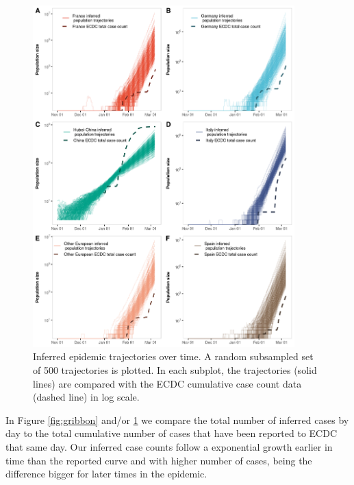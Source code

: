 \documentclass[12pt]{article}
\begin{document}
\begin{figure}[p]
    \centering
    \includegraphics[width=0.9\textwidth]{201030_europe3_figtraj02.png}
    \caption{Inferred epidemic trajectories over time. A random subsampled set of 500 trajectories is plotted. In each subplot, the trajectories (solid lines) are compared with the ECDC cumulative case count data (dashed line) in log scale.}
    \label{fig:trajs}
\end{figure}


In Figure \ref{fig:gribbon} and/or \ref{fig:trajs} we compare the total number of inferred cases by day to the total cumulative number of cases that have been reported to ECDC that same day. Our inferred case counts follow a exponential growth earlier in time than the reported curve and with higher number of cases, being the difference bigger for later times in the epidemic.\\
\end{document}
